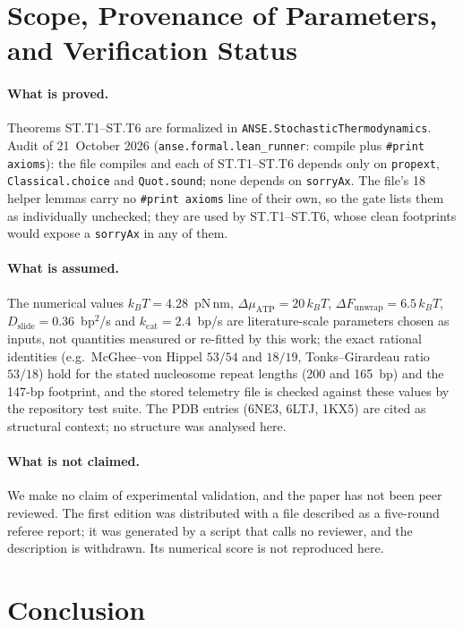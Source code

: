 \documentclass[11pt,a4paper]{article}
\theoremstyle{definition}
\begin{document}
\section{Scope, Provenance of Parameters, and Verification Status}
\label{sec:scope}
\paragraph{What is proved.} Theorems ST.T1--ST.T6 are formalized in \texttt{ANSE.StochasticThermodynamics}. Audit of 21~October 2026 (\texttt{anse.formal.lean\_runner}: compile plus \texttt{\#print axioms}): the file compiles and each of ST.T1--ST.T6 depends only on \texttt{propext}, \texttt{Classical.choice} and \texttt{Quot.sound}; none depends on \texttt{sorryAx}. The file's 18 helper lemmas carry no \texttt{\#print axioms} line of their own, so the gate lists them as individually unchecked; they are used by ST.T1--ST.T6, whose clean footprints would expose a \texttt{sorryAx} in any of them.
\paragraph{What is assumed.} The numerical values $k_BT=4.28$~pN\,nm, $\Delta\mu_{\mathrm{ATP}}=20\,k_BT$, $\Delta F_{\mathrm{unwrap}}=6.5\,k_BT$, $D_{\mathrm{slide}}=0.36$~bp$^2$/s and $k_{\mathrm{cat}}=2.4$~bp/s are literature-scale parameters chosen as inputs, not quantities measured or re-fitted by this work; the exact rational identities (e.g.\ McGhee--von Hippel $53/54$ and $18/19$, Tonks--Girardeau ratio $53/18$) hold for the stated nucleosome repeat lengths (200 and 165~bp) and the 147-bp footprint, and the stored telemetry file is checked against these values by the repository test suite. The PDB entries (6NE3, 6LTJ, 1KX5) are cited as structural context; no structure was analysed here.
\paragraph{What is not claimed.} We make no claim of experimental validation, and the paper has not been peer reviewed. The first edition was distributed with a file described as a five-round referee report; it was generated by a script that calls no reviewer, and the description is withdrawn. Its numerical score is not reproduced here.

\section{Conclusion}
\end{document}
